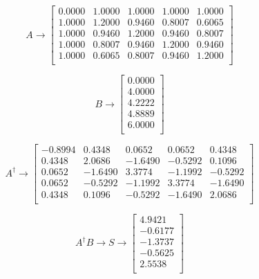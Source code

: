 \begin{equation}
        A\to \begin{bmatrix}
                0.0000 & 1.0000 & 1.0000 & 1.0000 & 1.0000 \\
                1.0000 & 1.2000 & 0.9460 & 0.8007 & 0.6065 \\
                1.0000 & 0.9460 & 1.2000 & 0.9460 & 0.8007 \\
                1.0000 & 0.8007 & 0.9460 & 1.2000 & 0.9460 \\
                1.0000 & 0.6065 & 0.8007 & 0.9460 & 1.2000 \\
        \end{bmatrix}
\end{equation}

\begin{equation}
        B\to \begin{bmatrix}
                0.0000 \\
                4.0000 \\
                4.2222 \\
                4.8889 \\
                6.0000 \\
        \end{bmatrix}
\end{equation}

\begin{equation}
        A^{\dag}\to \begin{bmatrix}
                -0.8994 & 0.4348  & 0.0652  & 0.0652  & 0.4348  \\
                0.4348  & 2.0686  & -1.6490 & -0.5292 & 0.1096  \\
                0.0652  & -1.6490 & 3.3774  & -1.1992 & -0.5292 \\
                0.0652  & -0.5292 & -1.1992 & 3.3774  & -1.6490 \\
                0.4348  & 0.1096  & -0.5292 & -1.6490 & 2.0686  \\
        \end{bmatrix}
\end{equation}

\begin{equation}
        A^{\dag}B\to S\to \begin{bmatrix}
                4.9421  \\
                -0.6177 \\
                -1.3737 \\
                -0.5625 \\
                2.5538  \\
        \end{bmatrix}
\end{equation}

